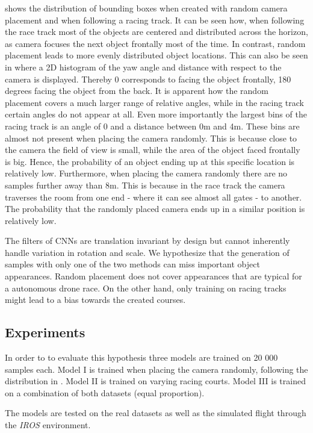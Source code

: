 shows the distribution of bounding boxes when created with random camera placement and when following a racing track. It can be seen how, when following the race track most of the objects are centered and distributed across the horizon, as camera focuses the next object frontally most of the time. In contrast, random placement leads to more evenly distributed object locations. This can also be seen in  where a 2D histogram of the yaw angle and distance with respect to the camera is displayed. Thereby 0 corresponds to facing the object frontally, 180 degrees facing the object from the back. It is apparent how the random placement covers a much larger range of relative angles, while in the racing track certain angles do not appear at all. Even more importantly the largest bins of the racing track is an angle of 0 and a distance between 0m and 4m. These bins are almost not present when placing the camera randomly. This is because close to the camera the field of view is small, while the area of the object faced frontally is big. Hence, the probability of an object ending up at this specific location is relatively low. Furthermore, when placing the camera randomly there are no samples further away than 8m. This is because in the race track the camera traverses the room from one end - where it can see almost all gates - to another. The probability that the randomly placed camera ends up in a similar position is relatively low.

The filters of \acp{CNN} are translation invariant by design but cannot inherently handle variation in rotation and scale. We hypothesize that the generation of samples with only one of the two methods can miss important object appearances. Random placement does not cover appearances that are typical for a autonomous drone race. On the other hand, only training on racing tracks might lead to a bias towards the created courses.

\subsection{Experiments}

In order to to evaluate this hypothesis three models are trained on 20 000 samples each. Model I is trained when placing the camera randomly, following the distribution in . Model II is trained on varying racing courts. Model III is trained on a combination of both datasets (equal proportion).

The models are tested on the real datasets as well as the simulated flight through the \textit{IROS} environment.

